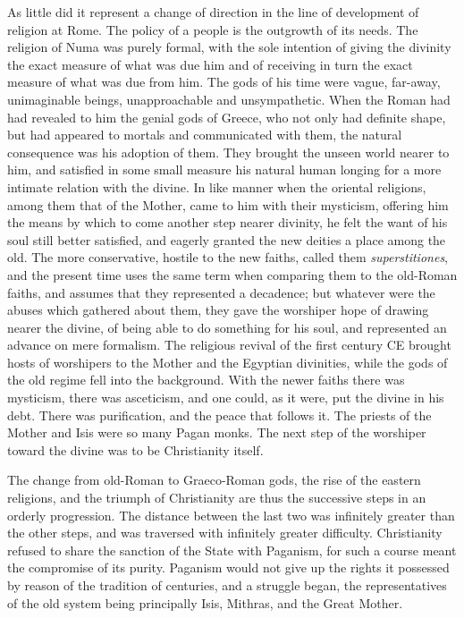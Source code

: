 \documentclass[a4paper, 11pt, oneside, polutonikogreek, english]{article}
\begin{document}
As little did it represent a change of direction in the line of development of religion at Rome. The policy of a people is the outgrowth of its needs. The religion of Numa was purely formal, with the sole intention of giving the divinity the exact measure of what was due him and of receiving in turn the exact measure of what was due from him. The gods of his time were vague, far-away, unimaginable beings, unapproachable and unsympathetic. When the Roman had had revealed to him the genial gods of Greece, who not only had definite shape, but had appeared to mortals and communicated with them, the natural consequence was his adoption of them. They brought the unseen world nearer to him, and satisfied in some small measure his natural human longing for a more intimate relation with the divine. In like manner when the oriental religions, among them that of the Mother, came to him with their mysticism, offering him the means by which to come another step nearer divinity, he felt the want of his soul still better satisfied, and eagerly granted the new deities a place among the old. The more conservative, hostile to the new faiths, called them \emph{superstitiones}, and the present time uses the same term when comparing them to the old-Roman faiths, and assumes that they represented a decadence; but whatever were the abuses which gathered about them, they gave the worshiper hope of drawing nearer the divine, of being able to do something for his soul, and represented an advance on mere formalism. The religious revival of the first century \textsc{CE} brought hosts of worshipers to the Mother and the Egyptian divinities, while the gods of the old regime fell into the background. With the newer faiths there was mysticism, there was asceticism, and one could, as it were, put the divine in his debt. There was purification, and the peace that follows it. The priests of the Mother and Isis were so many Pagan monks. The next step of the worshiper toward the divine was to be Christianity itself.

The change from old-Roman to Graeco-Roman gods, the rise of the eastern religions, and the triumph of Christianity are thus the successive steps in an orderly progression. The distance between the last two was infinitely greater than the other steps, and was traversed with infinitely greater difficulty. Christianity refused to share the sanction of the State with Paganism, for such a course meant the compromise of its purity. Paganism would not give up the rights it possessed by reason of the tradition of centuries, and a struggle began, the representatives of the old system being principally Isis, Mithras, and the Great Mother.
\end{document}
